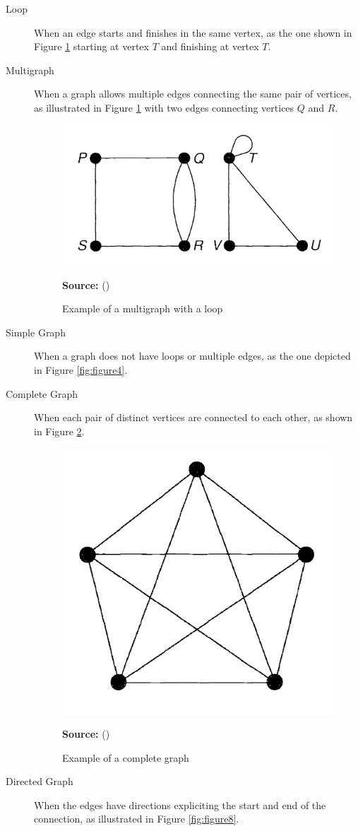 \begin{description}
\item[Loop] When an edge starts and finishes in the same vertex, as the one shown in Figure \ref{fig:figure6} starting at vertex $T$ and finishing at vertex $T$.
\item[Multigraph] When a graph allows multiple edges connecting the same pair of vertices, as illustrated in Figure \ref{fig:figure6} with two edges connecting vertices $Q$ and $R$.

\begin{figure}[ht]
\centering
\caption{Example of a multigraph with a loop}
\label{fig:figure6}
\includegraphics[width=.4\textwidth]{images/loop_multigraph_example.png}
\par\medskip\ABNTEXfontereduzida\selectfont\textbf{Source:} \citeauthor{Tobergte2013} (\citeyear{Tobergte2013}) \par\medskip
\end{figure}

\item[Simple Graph] When a graph does not have loops or multiple edges, as the one depicted in Figure \ref{fig:figure4}.
\item[Complete Graph] When each pair of distinct vertices are connected to each other, as shown in Figure \ref{fig:figure7}.

\begin{figure}[ht]
\centering
\caption{Example of a complete graph}
\label{fig:figure7}
\includegraphics[width=.25\textwidth]{images/complete_graph_example.png}
\par\medskip\ABNTEXfontereduzida\selectfont\textbf{Source:} \citeauthor{Tobergte2013} (\citeyear{Tobergte2013}) \par\medskip
\end{figure}

\item[Directed Graph] When the edges have directions expliciting the start and end of the connection, as illustrated in Figure \ref{fig:figure8}.


\end{description}
